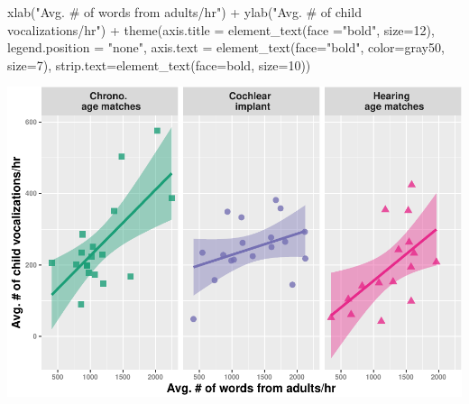 \documentclass[
]{article}
\newenvironment{Shaded}{\begin{snugshade}}{\end{snugshade}}
\newcommand{\AttributeTok}[1]{\textcolor[rgb]{0.77,0.63,0.00}{#1}}
\newcommand{\DecValTok}[1]{\textcolor[rgb]{0.00,0.00,0.81}{#1}}
\newcommand{\FunctionTok}[1]{\textcolor[rgb]{0.00,0.00,0.00}{#1}}
\newcommand{\NormalTok}[1]{#1}
\newcommand{\SpecialCharTok}[1]{\textcolor[rgb]{0.00,0.00,0.00}{#1}}
\newcommand{\StringTok}[1]{\textcolor[rgb]{0.31,0.60,0.02}{#1}}
\begin{document}
\begin{Shaded}
\begin{Highlighting}[]
  \FunctionTok{xlab}\NormalTok{(}\StringTok{"Avg. \# of words from adults/hr"}\NormalTok{) }\SpecialCharTok{+}
  \FunctionTok{ylab}\NormalTok{(}\StringTok{"Avg. \# of child vocalizations/hr"}\NormalTok{) }\SpecialCharTok{+} 
    \FunctionTok{theme}\NormalTok{(}\AttributeTok{axis.title =} \FunctionTok{element\_text}\NormalTok{(}\AttributeTok{face =}\StringTok{"bold"}\NormalTok{, }\AttributeTok{size=}\DecValTok{12}\NormalTok{),}
        \AttributeTok{legend.position =} \StringTok{"none"}\NormalTok{, }
        \AttributeTok{axis.text =} \FunctionTok{element\_text}\NormalTok{(}\AttributeTok{face=}\StringTok{"bold"}\NormalTok{, }\AttributeTok{color=}\StringTok{\textquotesingle{}gray50\textquotesingle{}}\NormalTok{, }\AttributeTok{size=}\DecValTok{7}\NormalTok{),}
        \AttributeTok{strip.text=}\FunctionTok{element\_text}\NormalTok{(}\AttributeTok{face=}\StringTok{\textquotesingle{}bold\textquotesingle{}}\NormalTok{, }\AttributeTok{size=}\DecValTok{10}\NormalTok{))}
\end{Highlighting}
\end{Shaded}

\includegraphics{everyday_CI_files/figure-latex/visualize input as words predicting num vocalizations-1.pdf}
\end{document}
